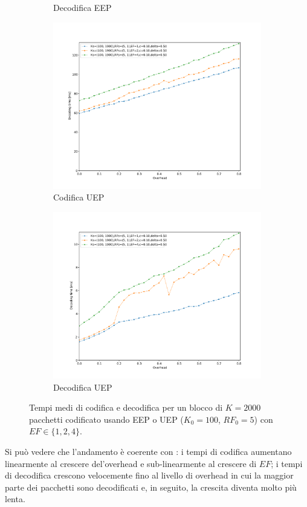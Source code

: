 \documentclass[italian, a4paper, 12pt]{article}
\begin{document}
\begin{figure}[htb]
\begin{subfigure}{0.5\textwidth}
    \caption{Decodifica EEP}
    \label{fig:dectime_eep}
  \end{subfigure}
  \begin{subfigure}{0.5\textwidth}
    \centering
    \includegraphics[width=\textwidth]{plot_enc_time_uep}
    \caption{Codifica UEP}
    \label{fig:enctime_uep}
  \end{subfigure}%
  \begin{subfigure}{0.5\textwidth}
    \centering
    \includegraphics[width=\textwidth]{plot_dec_time_uep}
    \caption{Decodifica UEP}
    \label{fig:dectime_uep}
  \end{subfigure}
  \caption{Tempi medi di codifica e decodifica per un blocco di
    $K=2000$ pacchetti codificato usando EEP o UEP ($K_0 = 100$,
    $RF_0=5$) con $EF \in \{1,2,4\}$.}
  \label{fig:encdec}
\end{figure}
%
Si può vedere che l'andamento è coerente con \cite{uep}: i tempi di
codifica aumentano linearmente al crescere del'overhead e
sub-linearmente al crescere di $EF$; i tempi di decodifica crescono
velocemente fino al livello di overhead in cui la maggior parte dei
pacchetti sono decodificati e, in seguito, la crescita diventa molto
più lenta.
\end{document}
